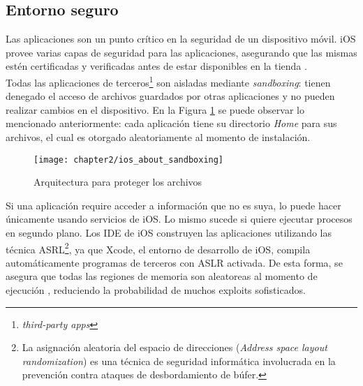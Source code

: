 \subsection{Entorno seguro}
Las aplicaciones son un punto crítico en la seguridad de un dispositivo móvil. iOS provee varias capas de seguridad para las aplicaciones, asegurando que las mismas estén certificadas y verificadas antes de estar disponibles en la tienda \cite{asg}.\\
Todas las aplicaciones de terceros\footnote{\textit{third-party apps}} son aisladas mediante \textit{sandboxing}: tienen denegado el acceso de archivos guardados por otras aplicaciones y no pueden realizar cambios en el dispositivo. En la Figura \ref{fig:ch02:sandboxing} se puede observar lo mencionado anteriormente: cada aplicaci\'on tiene su directorio \textit{Home} para sus archivos, el cual es otorgado aleatoriamente al momento de instalaci\'on.\\
\begin{figure}[hbtp]
	\centering
	\texttt{[image: chapter2/ios\_about\_sandboxing]}
    \caption{Arquitectura para proteger los archivos \cite{iosdl}} 
    \label{fig:ch02:sandboxing}
\end{figure}
Si una aplicaci\'on require acceder a información que no es suya, lo puede hacer únicamente usando servicios de iOS. Lo mismo sucede si quiere ejecutar procesos en segundo plano.
Los IDE de iOS construyen las aplicaciones utilizando las técnica ASRL\footnote{La asignación aleatoria del espacio de direcciones (\textit{Address space layout randomization}) es una técnica de seguridad informática involucrada en la prevención contra ataques de desbordamiento de búfer.}, ya que Xcode, el entorno de desarrollo de iOS, compila automáticamente programas de terceros con ASLR activada. De esta forma, se asegura que todas las regiones de memoria son aleatoreas al momento de ejecución \cite{asg}, reduciendo la probabilidad de muchos exploits sofisticados.
